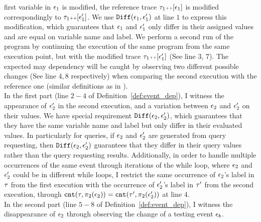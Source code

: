 {{%
first variable in $\mathtt{\epsilon}_1$ is modified, the reference trace $\mathtt{\tau}_1 {\scriptscriptstyle ++} [\mathtt{\epsilon}_1]$ is modified correspondingly to $\mathtt{\tau}_1 {\scriptscriptstyle ++} [\mathtt{\epsilon}_1']$.
We use $\mathtt{Diff}(\mathtt{\epsilon}_1, \mathtt{\epsilon}_1')$ at line $1$ to express this modification, which guarantees that $\mathtt{\epsilon}_1$ and $\mathtt{\epsilon}_1'$ only differ in their assigned values and are equal on variable name and label. We perform a second run of the program by continuing the execution of the same program from the same execution point, 
but with the modified trace $\mathtt{\tau}_1 {\scriptscriptstyle ++} [\mathtt{\epsilon}_1']$ (See line $3$, $7$). 
The expected may dependency will be caught by observing two different possible changes (See line $4, 8$ respectively) when comparing the second execution with the reference one (similar definitions as in \cite{Cousot19a}). 
\\
In the first part (line $2-4$ of Definition~\ref{def:event_dep}), I witness
the appearance of $\mathtt{\epsilon}_2'$ in the second execution, and
a variation between $\mathtt{\epsilon}_2$ and $\mathtt{\epsilon}_2'$ on their values.
We have special requirement $\mathtt{Diff}(\mathtt{\epsilon}_2, \mathtt{\epsilon}_2')$, which guarantees that they
have the same variable name and label but only differ 
in their evaluated values.
In particularly for queries, if $\mathtt{\epsilon}_2$ and $\mathtt{\epsilon}_2'$ are 
generated from query requesting, then $\mathtt{Diff}(\mathtt{\epsilon}_2, \mathtt{\epsilon}_2')$ guarantees that
they differ in their query values rather than the 
query requesting results. 
Additionally, in order to handle multiple occurrences of the same event through iterations of the while loop,
 where  $\mathtt{\epsilon}_2$ and $\mathtt{\epsilon}_2'$ could be 
in different while loops,
I restrict the same occurrence of $\mathtt{\epsilon}_2$'s label in $\mathtt{\tau}$ from the first execution with  the occurrence of $\mathtt{\epsilon}_2'$'s label in $\mathtt{\tau}'$ from the second execution,
through $\mathtt{cnt}(\mathtt{\tau}, \pi_2(\mathtt{\epsilon}_2))
= 
\mathtt{cnt}(\mathtt{\tau}', \pi_2(\mathtt{\epsilon}_2'))$ at line $4$.
\\
In the second part (line $5-8$ of Definition~\ref{def:event_dep}), I 
witness
the disappearance of $\mathtt{\epsilon}_2$ through observing the change of a testing event $\mathtt{\epsilon}_b$.
}}

